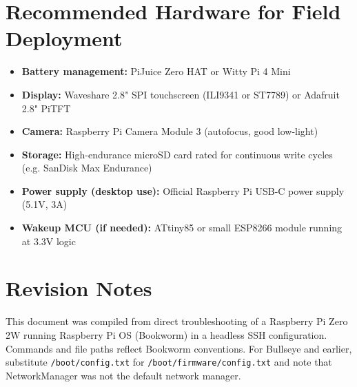 \documentclass[11pt,letter]{article}
\begin{document}
\section{Recommended Hardware for Field Deployment}

\begin{itemize}
  \item \textbf{Battery management:} PiJuice Zero HAT or Witty Pi 4 Mini
  \item \textbf{Display:} Waveshare 2.8" SPI touchscreen (ILI9341 or ST7789) or Adafruit 2.8" PiTFT
  \item \textbf{Camera:} Raspberry Pi Camera Module 3 (autofocus, good low-light)
  \item \textbf{Storage:} High-endurance microSD card rated for continuous write cycles (e.g. SanDisk Max Endurance)
  \item \textbf{Power supply (desktop use):} Official Raspberry Pi USB-C power supply (5.1V, 3A)
  \item \textbf{Wakeup MCU (if needed):} ATtiny85 or small ESP8266 module running at 3.3V logic
\end{itemize}

\section*{Revision Notes}

This document was compiled from direct troubleshooting of a Raspberry Pi Zero 2W running Raspberry Pi OS (Bookworm) in a headless SSH configuration. Commands and file paths reflect Bookworm conventions. For Bullseye and earlier, substitute \texttt{/boot/config.txt} for \texttt{/boot/firmware/config.txt} and note that NetworkManager was not the default network manager.
\end{document}
